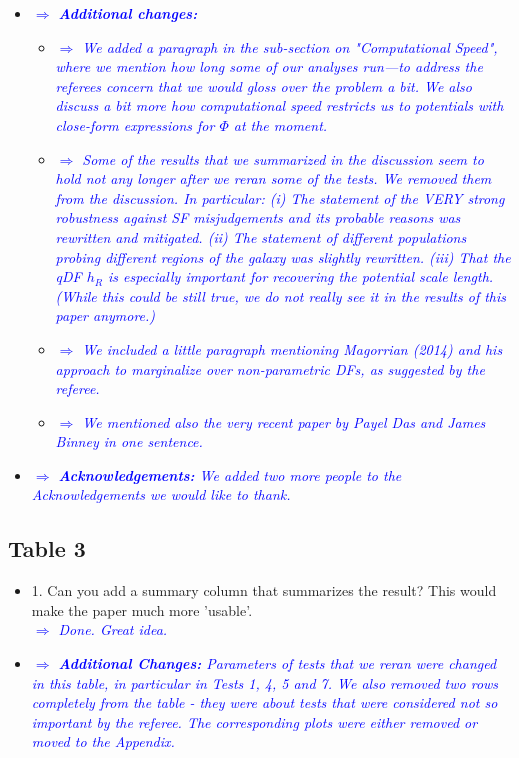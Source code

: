 \documentclass[10pt,a4paper]{article}
\newcommand{\Comment}[1]{\textsl{\textcolor{Blue}{$\Longrightarrow$ {#1}}}}
\begin{document}
\begin{itemize}
\item \Comment{\textbf{Additional changes:}}
\begin{itemize}
\item \Comment{We added a paragraph in the sub-section on "Computational Speed", where we mention how long some of our analyses run---to address the referees concern that we would gloss over the problem a bit. We also discuss a bit more how computational speed restricts us to potentials with close-form expressions for $\Phi$ at the moment.}
\item  \Comment{Some of the results that we summarized in the discussion seem to hold not any longer after we reran some of the tests. We removed them from the discussion. In particular: (i) The statement of the VERY strong robustness against SF misjudgements and its probable reasons was rewritten and mitigated. (ii) The statement of different populations probing different regions of the galaxy was slightly rewritten. (iii) That the qDF $h_R$ is especially important for recovering the potential scale length. (While this could be still true, we do not really see it in the results of this paper anymore.)}
\item  \Comment{We included a little paragraph mentioning Magorrian (2014) and his approach to marginalize over non-parametric DFs, as suggested by the referee.}
\item  \Comment{We mentioned also the very recent paper by Payel Das and James Binney in one sentence.}
\end{itemize}
\item \Comment{\textbf{Acknowledgements:} We added two more people to the Acknowledgements we would like to thank.}
\end{itemize}

\subsection{Table 3}
\begin{itemize}
\item 1. Can you add a summary column that summarizes the result? This would make the paper much more 'usable'. \\\Comment{Done. Great idea.}
\item \Comment{\textbf{Additional Changes:} Parameters of tests that we reran were changed in this table, in particular in Tests 1, 4, 5 and 7. We also removed two rows completely from the table - they were about tests that were considered not so important by the referee. The corresponding plots were either removed or moved to the Appendix.}
\end{itemize}
\end{document}
